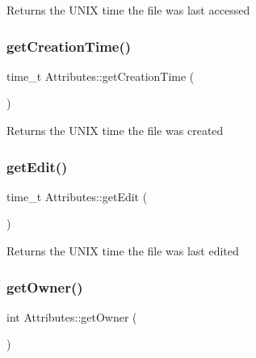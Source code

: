 \begin{DoxyReturn}{Returns}
the U\+N\+IX time the file was last accessed 
\end{DoxyReturn}
\mbox{\label{classAttributes_ac6436c08d31dfa33783feee3469a88e9}} 
\subsubsection{\texorpdfstring{get\+Creation\+Time()}{getCreationTime()}}
{\footnotesize\ttfamily time\+\_\+t Attributes\+::get\+Creation\+Time (\begin{DoxyParamCaption}{ }\end{DoxyParamCaption})}

\begin{DoxyReturn}{Returns}
the U\+N\+IX time the file was created 
\end{DoxyReturn}
\mbox{\label{classAttributes_a7b646531a3cb941912802eed0ef91f54}} 
\subsubsection{\texorpdfstring{get\+Edit()}{getEdit()}}
{\footnotesize\ttfamily time\+\_\+t Attributes\+::get\+Edit (\begin{DoxyParamCaption}{ }\end{DoxyParamCaption})}

\begin{DoxyReturn}{Returns}
the U\+N\+IX time the file was last edited 
\end{DoxyReturn}
\mbox{\label{classAttributes_a378205f2087ee66d95eb58aa5d7fb040}} 
\subsubsection{\texorpdfstring{get\+Owner()}{getOwner()}}
{\footnotesize\ttfamily int Attributes\+::get\+Owner (\begin{DoxyParamCaption}{ }\end{DoxyParamCaption})}

